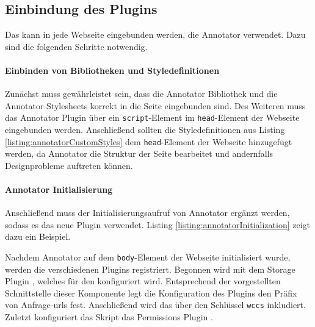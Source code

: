 \subsection{Einbindung des Plugins}
    \label{section:solutionDetailsAnnotatorPluginIntegration}
    Das {\annotatorPlugin} kann in jede Webseite eingebunden werden,
    die Annotator verwendet.
    Dazu sind die folgenden Schritte notwendig.

    \paragraph*{Einbinden von Bibliotheken und Styledefinitionen}
    Zunächst muss gewährleistet sein, dass die
    Annotator Bibliothek
    und die Annotator Stylesheets
    \cite[Kapitel "`Getting started with Annotator"']{annotator:documentation}
    korrekt in die Seite eingebunden sind.
    Des Weiteren muss das Annotator Plugin über ein \texttt{script}-Element
    im \texttt{head}-Element der Webseite eingebunden werden.
    Anschließend sollten die Styledefinitionen aus Listing \ref{listing:annotatorCustomStyles}
    dem \texttt{head}-Element der Webseite hinzugefügt werden,
    da Annotator die Struktur der Seite bearbeitet und andernfalls Designprobleme auftreten können.

    

    \paragraph*{Annotator Initialisierung}
    Anschließend muss der Initialisierungsaufruf von Annotator ergänzt werden,
    sodass es das neue Plugin verwendet.
    Listing \ref{listing:annotatorInitialization} zeigt dazu ein Beispiel.

    

    Nachdem Annotator auf dem \texttt{body}-Element der Webseite initialisiert wurde,
    werden die verschiedenen Plugins registriert.
    Begonnen wird mit dem
    Storage Plugin \cite[Kapitel "`Plugins"']{annotator:documentation},
    welches für den {\annotationService} konfiguriert wird.
    Entsprechend der vorgestellten Schnittstelle dieser
    Komponente
    legt die Konfiguration des Plugins den Präfix von Anfrage-\glspl{url} fest.
    Anschließend wird das {\annotatorPlugin} über den Schlüssel \texttt{wccs} inkludiert.
    Zuletzt konfiguriert das Skript das
    Permissions Plugin \cite[Kapitel "`Plugins"']{annotator:documentation}.
